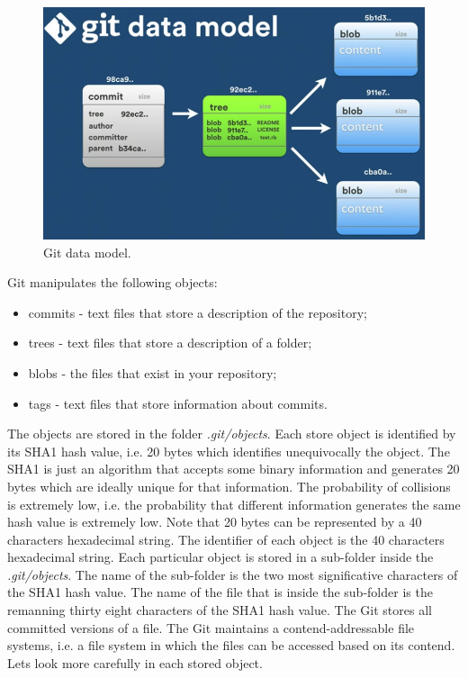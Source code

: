 \begin{refsection}
\begin{figure}[h!]
  \centering
  \includegraphics[width=12cm]{./chapter/git/figures/git_data_model.png}
  \caption{Git data model.}\label{git_data_model}
\end{figure}

Git manipulates the following objects:

\begin{itemize}
    \item[\textbullet] {commits - text files that store a description of the repository;}
    \item[\textbullet] {trees - text files that store a description of a folder;}
    \item[\textbullet] {blobs - the files that exist in your repository;}
    \item[\textbullet] {tags - text files that store information about commits.}
\end{itemize}
%
\noindent The objects are stored in the folder \emph{.git/objects}.
Each store object is identified by its SHA1 hash value, i.e. 20 bytes which identifies unequivocally the object.
The SHA1 is just an algorithm that accepts some binary information and generates 20 bytes which are ideally unique for that information. The probability of collisions is extremely low, i.e. the probability that different information generates the same hash value is extremely low.
Note that 20 bytes can be represented by a 40 characters hexadecimal string.
The identifier of each object is the 40 characters hexadecimal string.
Each particular object is stored in a sub-folder inside the \emph{.git/objects}.
The name of the sub-folder is the two most significative characters of the SHA1 hash value.
The name of the file that is inside the sub-folder is the remanning thirty eight characters of the SHA1 hash value.
The Git stores all committed versions of a file.
The Git maintains a contend-addressable file systems, i.e. a file system in which the files can be accessed based on its contend. Lets look more carefully in each stored object.


\end{refsection}
